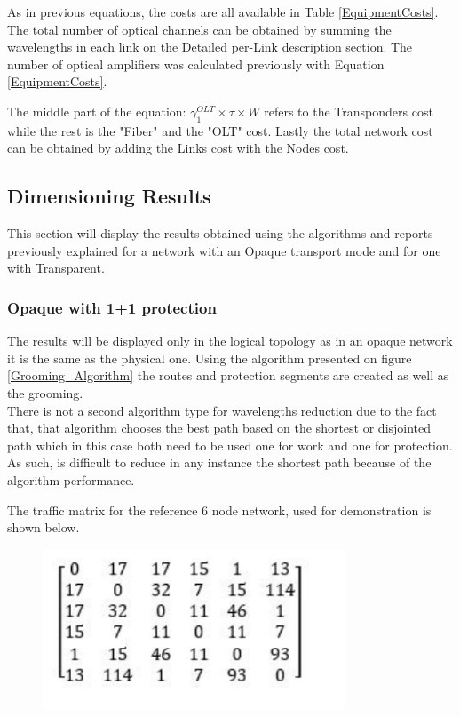 	As in previous equations, the costs are all available in Table \ref{EquipmentCosts}. The total number of optical channels can be obtained by summing the wavelengths in each link on the Detailed per-Link description section. The number of optical amplifiers was calculated previously with Equation \ref{EquipmentCosts}.
	
	The middle part of the equation: $\gamma_1^{OLT} \times \tau \times W$ refers to the Transponders cost while the rest is the "Fiber" and the "OLT" cost.	Lastly the total network cost can be obtained by adding the Links cost with the Nodes cost.\\
	
	\subsection{Dimensioning Results}
	This section will display the results obtained using the algorithms and reports previously explained for a network with an Opaque transport mode and for one with Transparent.

	
	\subsubsection{Opaque with 1+1 protection}
	
	The results will be displayed only in the logical topology as in an opaque network it is the same as the physical one.
	Using the algorithm presented on figure \ref{Grooming_Algorithm} the routes and protection segments are created as well as the grooming. \\
	
	There is not a second algorithm type for wavelengths reduction due to the fact that, that algorithm chooses the best path based on the shortest or disjointed path which in this case both need to be used one for work and one for protection. As such, is difficult to reduce in any instance the shortest path because of the algorithm performance.
	
	The traffic matrix for the reference 6 node network, used for demonstration is shown below.
	
	\begin{figure}[h!]
		\centering
		\includegraphics[width=9cm]{opaqueLineMatricesLogical11.pdf}	
		\caption{}
		\label{opaqueLineMatricesLogical11}								
	\end{figure}	
	
